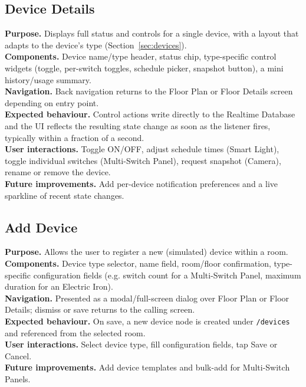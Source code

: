 \documentclass[11pt,a4paper]{article}
\begin{document}
\subsection{Device Details}
\textbf{Purpose.} Displays full status and controls for a single device, with a layout that adapts to the device's type (Section~\ref{sec:devices}).\\
\textbf{Components.} Device name/type header, status chip, type-specific control widgets (toggle, per-switch toggles, schedule picker, snapshot button), a mini history/usage summary.\\
\textbf{Navigation.} Back navigation returns to the Floor Plan or Floor Details screen depending on entry point.\\
\textbf{Expected behaviour.} Control actions write directly to the Realtime Database and the UI reflects the resulting state change as soon as the listener fires, typically within a fraction of a second.\\
\textbf{User interactions.} Toggle ON/OFF, adjust schedule times (Smart Light), toggle individual switches (Multi-Switch Panel), request snapshot (Camera), rename or remove the device.\\
\textbf{Future improvements.} Add per-device notification preferences and a live sparkline of recent state changes.

\subsection{Add Device}
\textbf{Purpose.} Allows the user to register a new (simulated) device within a room.\\
\textbf{Components.} Device type selector, name field, room/floor confirmation, type-specific configuration fields (e.g. switch count for a Multi-Switch Panel, maximum duration for an Electric Iron).\\
\textbf{Navigation.} Presented as a modal/full-screen dialog over Floor Plan or Floor Details; dismiss or save returns to the calling screen.\\
\textbf{Expected behaviour.} On save, a new device node is created under \texttt{/devices} and referenced from the selected room.\\
\textbf{User interactions.} Select device type, fill configuration fields, tap Save or Cancel.\\
\textbf{Future improvements.} Add device templates and bulk-add for Multi-Switch Panels.
\end{document}
